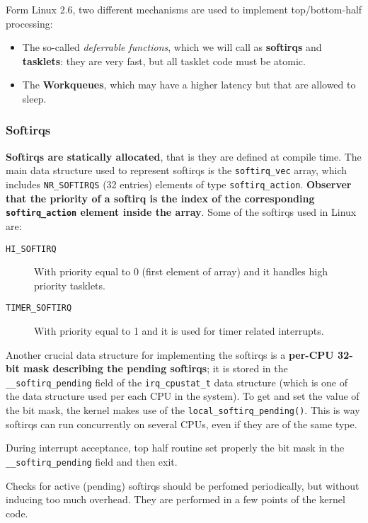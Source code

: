 \documentclass[10pt,a4paper]{article}
\begin{document}
Form Linux 2.6, two different mechanisms are used to implement top/bottom-half processing:
\begin{itemize}
\item The so-called \textit{deferrable functions}, which we will call as \textbf{softirqs} and \textbf{tasklets}: they are very fast, but all tasklet code must be atomic.
\item The \textbf{Workqueues}, which may have a higher latency but that are allowed to sleep.
\end{itemize}

\subsubsection{Softirqs}

\textbf{Softirqs are statically allocated}, that is they are defined at compile time. The main data structure used to represent softirqs is the \texttt{softirq\_vec} array, which includes \texttt{NR\_SOFTIRQS} (32 entries) elements of type \texttt{softirq\_action}. \textbf{Observer that the priority of a softirq is the index of the corresponding \texttt{softirq\_action} element inside the array}. Some of the softirqs used in Linux are:

\begin{description}
\item[\texttt{HI\_SOFTIRQ}] With priority equal to 0 (first element of array) and it handles high priority tasklets.
\item[\texttt{TIMER\_SOFTIRQ}] With priority equal to 1 and it is used for timer related interrupts.
\end{description}

Another crucial data structure for implementing the softirqs is a \textbf{per-CPU 32-bit mask describing the pending softirqs}; it is stored in the \texttt{\_\_softirq\_pending} field of the \texttt{irq\_cpustat\_t} data structure (which is one of the data structure used per each CPU in the system). To get and set the value of the bit mask, the kernel makes use of the \texttt{local\_softirq\_pending()}. This is way softirqs can run concurrently on several CPUs, even if they are of the same type.

During interrupt acceptance, top half routine set properly the bit mask in the \texttt{\_\_softirq\_pending} field and then exit. 

Checks for active (pending) softirqs should be perfomed periodically, but without inducing too much overhead. They are performed in a few points of the kernel code. 
\end{document}

